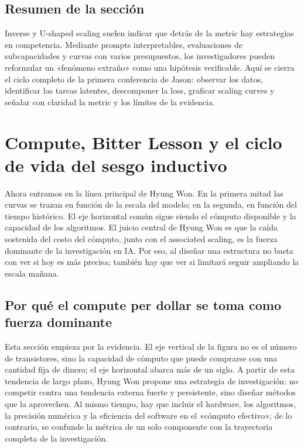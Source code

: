 \documentclass[a4paper]{article}
\begin{document}
\subsection{Resumen de la sección}

Inverse y U-shaped scaling suelen indicar que detrás de la metric hay estrategias en competencia. Mediante prompts interpretables, evaluaciones de subcapacidades y curvas con varios presupuestos, los investigadores pueden reformular un «fenómeno extraño» como una hipótesis verificable. Aquí se cierra el ciclo completo de la primera conferencia de Jason: observar los datos, identificar las tareas latentes, descomponer la loss, graficar scaling curves y señalar con claridad la metric y los límites de la evidencia.
\section{Compute, Bitter Lesson y el ciclo de vida del sesgo inductivo}

Ahora entramos en la línea principal de Hyung Won. En la primera mitad las curvas se trazan en función de la escala del modelo; en la segunda, en función del tiempo histórico. El eje horizontal común sigue siendo el cómputo disponible y la capacidad de los algoritmos. El juicio central de Hyung Won es que la caída sostenida del costo del cómputo, junto con el associated scaling, es la fuerza dominante de la investigación en IA. Por eso, al diseñar una estructura no basta con ver si hoy es más precisa; también hay que ver si limitará seguir ampliando la escala mañana.

\subsection{Por qué el compute per dollar se toma como fuerza dominante}

Esta sección empieza por la evidencia. El eje vertical de la figura no es el número de transistores, sino la capacidad de cómputo que puede comprarse con una cantidad fija de dinero; el eje horizontal abarca más de un siglo. A partir de esta tendencia de largo plazo, Hyung Won propone una estrategia de investigación: no competir contra una tendencia externa fuerte y persistente, sino diseñar métodos que la aprovechen. Al mismo tiempo, hay que incluir el hardware, los algoritmos, la precisión numérica y la eficiencia del software en el «cómputo efectivo»; de lo contrario, se confunde la métrica de un solo componente con la trayectoria completa de la investigación.
\end{document}

